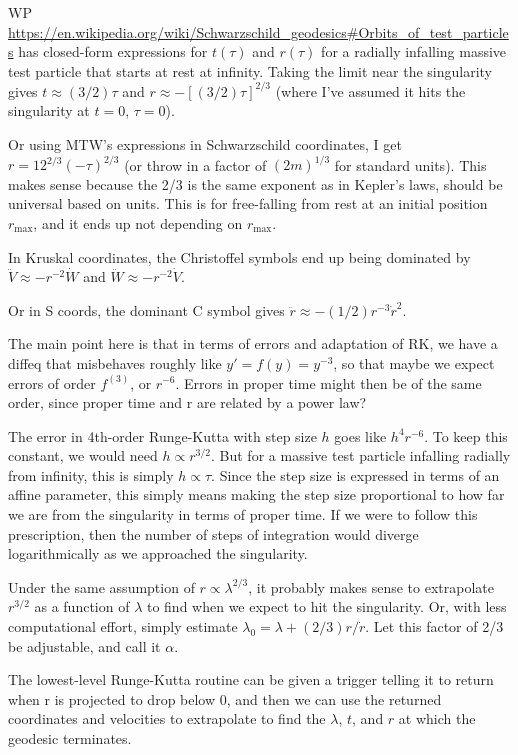 \documentclass{article}
\begin{document}
WP
\url{https://en.wikipedia.org/wiki/Schwarzschild_geodesics#Orbits_of_test_particles}
has closed-form expressions for $t(\tau)$ and $r(\tau)$ for a radially infalling
massive test particle that starts at rest at infinity. Taking the limit near the singularity gives
$t\approx(3/2)\tau$ and $r\approx -[(3/2)\tau]^{2/3}$ (where I've assumed it hits
the singularity at $t=0$, $\tau=0$).

Or using MTW's expressions in Schwarzschild coordinates, I get
$r=12^{2/3}(-\tau)^{2/3}$ (or throw in a factor of $(2m)^{1/3}$ for
standard units). This makes sense because the 2/3 is the same exponent
as in Kepler's laws, should be universal based on units. This is for free-falling
from rest at an initial position $r_\text{max}$, and it ends up not depending
on $r_\text{max}$.

In Kruskal coordinates, the Christoffel symbols end up being dominated by
$\ddot{V}\approx -r^{-2}\dot{W}$ and $\ddot{W}\approx -r^{-2}\dot{V}$.

Or in S coords, the dominant C symbol gives $\ddot{r}\approx -(1/2)r^{-3}\dot{r}^2$.

The main point here is that in terms of errors and adaptation of RK,
we have a diffeq that misbehaves roughly like $y'=f(y)=y^{-3}$, so that
maybe we expect errors of order $f^{(3)}$, or $r^{-6}$. Errors in proper
time might then be of the same order, since proper time and r are related
by a power law?

The error in 4th-order Runge-Kutta with step size $h$ goes like $h^4r^{-6}$.
To keep this constant, we would need $h\propto r^{3/2}$. But for a massive
test particle infalling radially from infinity, this is simply $h\propto \tau$. Since the
step size is expressed in terms of an affine parameter, this simply means
making the step size proportional to how far we are from the singularity in terms of proper time.
If we were to follow this prescription, then the number of steps of integration would diverge
logarithmically as we approached the singularity.

Under the same assumption of $r\propto\lambda^{2/3}$, it probably makes sense
to extrapolate $r^{3/2}$ as a function of $\lambda$ to find when we expect
to hit the singularity. Or, with less computational effort, simply estimate
$\lambda_0=\lambda+(2/3)r/\dot{r}$. Let this factor of 2/3 be adjustable, and
call it $\alpha$.

The lowest-level Runge-Kutta routine can be given a trigger telling it to
return when r is projected to drop below 0, and then we can use the returned
coordinates and velocities to extrapolate to find the $\lambda$, $t$, and $r$
at which the geodesic terminates.
\end{document}
